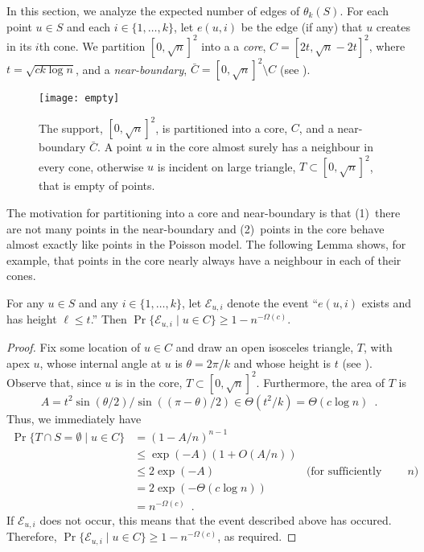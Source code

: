 \documentclass{patmorin}
\begin{document}
In this section, we analyze the expected number of edges of $\theta_k(S)$.
For each point $u\in S$ and each $i\in\{1,\ldots,k\}$, let $e(u,i)$ be
the edge (if any) that $u$ creates in its $i$th cone.  We partition
$[0,\sqrt{n}]^2$ into a a \emph{core}, $C=[2t,\sqrt{n}-2t]^2$,
where $t=\sqrt{ck\log n}$, and a \emph{near-boundary},
$\bar{C}=[0,\sqrt{n}]^2\setminus C$ (see ).

\begin{figure}
  \begin{center}
    \texttt{[image: empty]}
  \end{center}
  \caption{The support, $[0,\sqrt{n}]^2$, is partitioned into a core, $C$,
    and a near-boundary $\bar{C}$.  A point $u$ in the core almost surely
    has a neighbour in every cone, otherwise $u$ is incident on large
    triangle, $T\subset [0,\sqrt{n}]^2$, that is empty of points.}
\end{figure}

The motivation for partitioning into a core and near-boundary is that
(1)~there are not many points in the near-boundary and (2)~points
in the core behave almost exactly like points in the Poisson model.
The following Lemma shows, for example, that points in the core nearly
always have a neighbour in each of their cones.

\newcommand{\eui}{\mathcal{E}_{u,i}}

\begin{lem}
  For any $u\in S$ and any $i\in\{1,\ldots,k\}$, let $\eui$ denote
  the event ``$e(u,i)$ exists and has height $\ell\le t$.''  Then
  $\Pr\{\eui\mid u\in C\} \ge 1-n^{-\Omega(c)}$.
\end{lem}

\begin{proof}
  Fix some location of $u\in C$ and draw an open isosceles triangle,
  $T$, with apex $u$, whose internal angle at $u$ is $\theta=2\pi/k$
  and whose height is $t$ (see ).  Observe that, since $u$
  is in the core, $T\subset [0,\sqrt{n}]^2$.  Furthermore, the area of $T$
  is 
  \[ 
     A = t^2\sin(\theta/2)/\sin((\pi-\theta)/2)\in \Theta(t^2/k) = \Theta(c\log n) \enspace .
  \]
  Thus, we immediately have
  \begin{align*}
    \Pr\{T\cap S=\emptyset\mid u\in C\} 
       & = (1-A/n)^{n-1} \\
       & \le \exp(-A)(1+O(A/n)) \\
       & \le 2\exp(-A) & \text{(for sufficiently large $n$)}\\
       & = 2\exp(-\Theta(c\log n)) \\
       & = n^{-\Omega(c)} \enspace .
  \end{align*}
  If $\eui$ does not occur, this means that the event described above
  has occured.  Therefore, $\Pr\{\eui\mid u\in C\}\ge 1-n^{-\Omega(c)}$,
  as required.
\end{proof}
\end{document}
